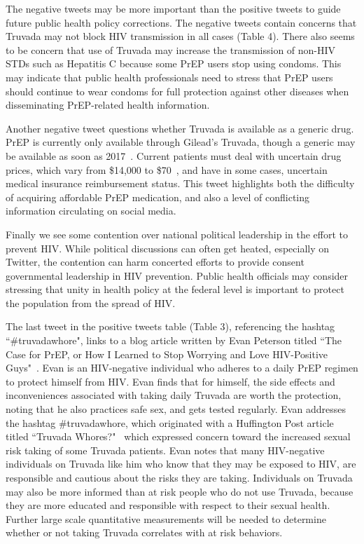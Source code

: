 \documentclass{sig-alternate-05-2015}
\begin{document}
The negative tweets may be more important than the positive tweets to guide future public health policy corrections. The negative tweets contain concerns that Truvada may not block HIV transmission in all cases (Table 4). There also seems to be concern that use of Truvada may increase the transmission of non-HIV STDs such as Hepatitis C because some PrEP users stop using condoms. This may indicate that public health professionals need to stress that PrEP users should continue to wear condoms for full protection against other diseases when disseminating PrEP-related health information.

Another negative tweet questions whether Truvada is available as a generic drug. PrEP is currently only available through Gilead's Truvada, though a generic may be available as soon as 2017~\cite{truvadagenericblog}. Current patients must deal with uncertain drug prices, which vary from \$14,000 to \$70~\cite{truvadagenericblog}, and have in some cases, uncertain medical insurance reimbursement status. This tweet highlights both the difficulty of acquiring affordable PrEP medication, and also a level of conflicting information circulating on social media.

Finally we see some contention over national political leadership in the effort to prevent HIV. While political discussions can often get heated, especially on Twitter, the contention can harm concerted efforts to provide consent governmental leadership in HIV prevention. Public health officials may consider stressing that unity in health policy at the federal level is important to protect the population from the spread of HIV.

The last tweet in the positive tweets table (Table 3), referencing the hashtag ``\#truvadawhore", links to a blog article written by Evan Peterson titled ``The Case for PrEP, or How I Learned to Stop Worrying and Love HIV-Positive Guys"~\cite{caseforprep}. Evan is an HIV-negative individual who adheres to a daily PrEP regimen to protect himself from HIV. Evan finds that for himself, the side effects and inconveniences associated with taking daily Truvada are worth the protection, noting that he also practices safe sex, and gets tested regularly. Evan addresses the hashtag \#truvadawhore, which originated with a Huffington Post article titled ``Truvada Whores?"~\cite{truvadawhore} which expressed concern toward the increased sexual risk taking of some Truvada patients. Evan notes that many HIV-negative individuals on Truvada like him who know that they may be exposed to HIV, are responsible and cautious about the risks they are taking. Individuals on Truvada may also be more informed than at risk people who do not use Truvada, because they are more educated and responsible with respect to their sexual health. Further large scale quantitative measurements will be needed to determine whether or not taking Truvada correlates with at risk behaviors.
\end{document}
